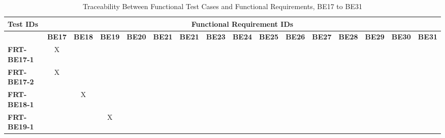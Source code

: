 \documentclass[12pt, titlepage]{article}
\begin{document}
\begin{landscape}
	\newpage

	\begin{longtable}{|l|ccccccccccccccc|}
		\caption{Traceability Between Functional Test Cases and Functional Requirements, BE17 to BE31}                                                                                                                                                                                                                  \\
		\hline
		\textbf{Test IDs}   & \multicolumn{15}{c|}{\textbf{Functional Requirement IDs}}                                                                                                                                                                                                                                 \\
		\hline
		~                   & \textbf{BE17}                                             & \textbf{BE18} & \textbf{BE19} & \textbf{BE20} & \textbf{BE21} & \textbf{BE21} & \textbf{BE23} & \textbf{BE24} & \textbf{BE25} & \textbf{BE26} & \textbf{BE27} & \textbf{BE28} & \textbf{BE29} & \textbf{BE30} & \textbf{BE31} \\
		\hline
		\textbf{FRT-BE17-1} & X                                                         & ~             & ~             & ~             & ~             & ~             & ~             & ~             & ~             & ~             & ~             & ~             & ~             & ~             & ~             \\
		\textbf{FRT-BE17-2} & X                                                         & ~             & ~             & ~             & ~             & ~             & ~             & ~             & ~             & ~             & ~             & ~             & ~             & ~             & ~             \\
		\textbf{FRT-BE18-1} & ~                                                         & X             & ~             & ~             & ~             & ~             & ~             & ~             & ~             & ~             & ~             & ~             & ~             & ~             & ~             \\
		\textbf{FRT-BE19-1} & ~                                                         & ~             & X             & ~             & ~             & ~             & ~             & ~             & ~             & ~             & ~             & ~             & ~             & ~             & ~             \\

\end{longtable}
\end{landscape}
\end{document}

